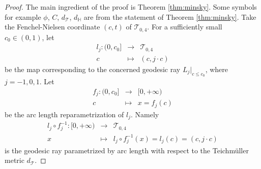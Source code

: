 \documentclass[10pt,a4paper]{amsart}
\begin{document}
\begin{proof}
 The main ingredient of the proof is Theorem \ref{thm:minsky}. Some symbols for example $\phi$, $C$, $d_{\mathcal{T}}$, $d_{\mathbb{H}}$ are from the statement of Theorem \ref{thm:minsky}. 
Take the Fenchel-Nielsen coordinate $(c,t)$ of $\mathcal{T}_{0,4}$.
 For a sufficiently small $c_0 \in (0,1)$,  let
 \begin{eqnarray*}
  l_j: (0,c_0] &\to& \mathcal{T}_{0,4} \\
  c &\mapsto& (c,j\cdot c)
 \end{eqnarray*}
 be the map corresponding to the concerned geodesic ray $L_j|_{c \le c_0}$, where $j= -1, 0, 1$. 
 Let 
 \begin{eqnarray*}
  f_j: (0,c_0] & \to & [0,+\infty) \\
  c& \mapsto & x = f_j(c) 
 \end{eqnarray*}
 be the arc length reparametrization of $l_j$. Namely
 \begin{eqnarray*}
  l_j\circ f_j^{-1}: [0,+\infty) & \to & \mathcal{T}_{0,4} \\
         x & \mapsto &  l_j\circ f_j^{-1}(x)= l_j(c) = (c, j\cdot c)
 \end{eqnarray*}
 is the geodesic ray parametrized by arc length with respect to the Teichm\"uller metric $d_{\mathcal{T}}$. 


\end{proof}
\end{document}
